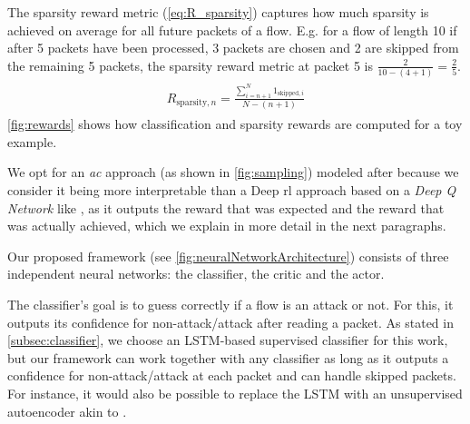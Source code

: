 \documentclass[conference]{IEEEtran}
\newcommand\note[2]{{\color{#1}#2}}
\begin{document}
The sparsity reward metric (\autoref{eq:R_sparsity}) captures how much sparsity is achieved on average for all future packets of a flow. E.g. for a flow of length 10 if after 5 packets have been processed, 3 packets are chosen and 2 are skipped from the remaining 5 packets, the sparsity reward metric at packet 5 is $\frac{2}{10-(4+1)}=\frac{2}{5}$.
\begin{align}
\begin{split}
R_{\text{sparsity},n} = \frac{\sum_{i=n+1}^{N} 1_{\text{skipped},i}}{N-(n+1)}
\end{split}
\label{eq:R_sparsity}
\end{align}
\autoref{fig:rewards} shows how classification and sparsity rewards are computed for a toy example.

We opt for an \emph{\gls{ac}} approach (as shown in \autoref{fig:sampling}) modeled after \cite{mnih_asynchronous_2016} because we consider it being more interpretable than a Deep \gls{rl} approach based on a \textit{Deep Q Network} like \cite{mnih_playing_2013}, as it outputs the reward that was expected and the reward that was actually achieved, which we explain in more detail in the next paragraphs.

Our proposed framework (see \autoref{fig:neuralNetworkArchitecture}) consists of three independent neural networks: the classifier, the critic and the actor.

The classifier's goal is to guess correctly if a flow is an attack or not. For this, it outputs its confidence for non-attack/attack after reading a packet. As stated in \autoref{subsec:classifier}, we choose an LSTM-based supervised classifier for this work, but our framework can work together with any classifier as long as it outputs a confidence for non-attack/attack at each packet and can handle skipped packets. For instance, it would also be possible to replace the LSTM with an unsupervised autoencoder akin to \cite{mirsky_kitsune_2018}.
\end{document}
